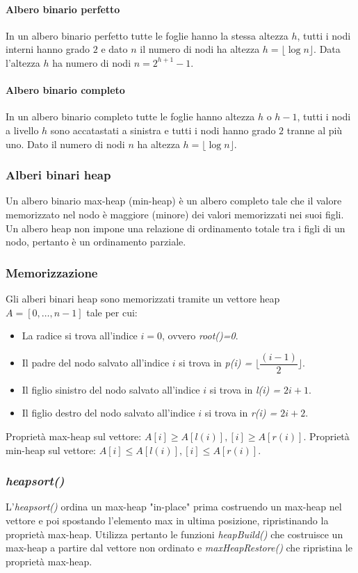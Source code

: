 \paragraph{Albero binario perfetto}
In un albero binario perfetto tutte le foglie hanno la stessa altezza $h$, tutti i nodi interni hanno grado $2$ e dato $n$ il numero di nodi ha altezza
$h=\lfloor \log n\rfloor$. Data l'altezza $h$ ha numero di nodi $n=2^{h+1}-1$.
\paragraph{Albero binario completo}
In un albero binario completo tutte le foglie hanno altezza $h$ o $h-1$, tutti i nodi a livello $h$ sono accatastati a sinistra e tutti i nodi hanno grado 
$2$ tranne al pi\`u uno. Dato il numero di nodi $n$ ha altezza $h=\lfloor \log n\rfloor$.
\subsubsection{Alberi binari heap}
Un albero binario max-heap (min-heap) \`e un albero completo tale che il valore memorizzato nel nodo \`e maggiore (minore) dei valori memorizzati nei suoi
figli. Un albero heap non impone una relazione di ordinamento totale tra i figli di un nodo, pertanto \`e un ordinamento parziale. 
\subsubsection{Memorizzazione}
Gli alberi binari heap sono memorizzati tramite un vettore heap $A=[0, \dots, n-1]$ tale per cui: 
\begin{itemize}
\item La radice si trova all'indice $i=0$, ovvero \emph{root()=0}.
\item Il padre del nodo salvato all'indice $i$ si trova in \emph{p(i) = $\lfloor\dfrac{(i-1)}{2} \rfloor$}.
\item Il figlio sinistro del nodo salvato all'indice $i$ si trova in \emph{l(i) = $2i+1$}.
\item Il figlio destro del nodo salvato all'indice $i$ si trova in \emph{r(i) = $2i+2$}.
\end{itemize}
Propriet\`a max-heap sul vettore: $A[i]\ge A[l(i)], [i]\ge A[r(i)]$. Propriet\`a min-heap sul vettore: $A[i]\le A[l(i)], [i]\le A[r(i)]$.
\subsubsection{\emph{heapsort()}}
L'\emph{heapsort()} ordina un max-heap "in-place" prima costruendo un max-heap nel vettore e poi spostando l'elemento max in ultima posizione, ripristinando
la propriet\`a max-heap. Utilizza pertanto le funzioni \emph{heapBuild()} che costruisce un max-heap a partire dal vettore non ordinato e \emph{ 
maxHeapRestore()} che ripristina le propriet\`a max-heap.
